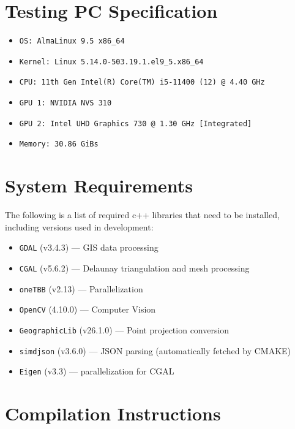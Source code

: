 \documentclass[12pt]{article}
\begin{document}
\pagebreak
\begin{appendices}

  \section{Testing PC Specification}\label{appendix:specs}

  \begin{itemize}
    \item \texttt{OS: AlmaLinux 9.5 x86\_64} %
    \item \texttt{Kernel: Linux 5.14.0-503.19.1.el9\_5.x86\_64}
    \item \texttt{CPU: 11th Gen Intel(R) Core(TM) i5-11400 (12) @ 4.40 GHz}
    \item \texttt{GPU 1: NVIDIA NVS 310}
    \item \texttt{GPU 2: Intel UHD Graphics 730 @ 1.30 GHz [Integrated]}
    \item \texttt{Memory: 30.86 GiBs}
  \end{itemize}

  \section{System Requirements}

  The following is a list of required c++ libraries that need to be installed, including versions used in development:

  \begin{itemize}
    \item \texttt{GDAL} (v3.4.3) --- GIS data processing
    \item \texttt{CGAL} (v5.6.2) --- Delaunay triangulation and mesh processing
    \item \texttt{oneTBB} (v2.13) --- Parallelization
    \item \texttt{OpenCV} (4.10.0) --- Computer Vision
    \item \texttt{GeographicLib} (v26.1.0) --- Point projection conversion
    \item \texttt{simdjson} (v3.6.0) --- JSON parsing (automatically fetched by CMAKE)
    \item \texttt{Eigen} (v3.3) --- parallelization for CGAL
  \end{itemize}

  \section{Compilation Instructions}


\end{appendices}
\end{document}
